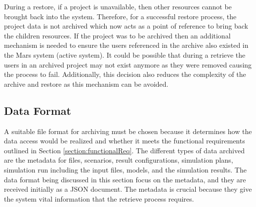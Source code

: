 During a restore, if a project
is unavailable, then other resources cannot be brought back into the system. Therefore, for a successful restore process,
the project data is not archived which now acts as a point of reference to bring back the children resources. 
If the project was to be archived then an additional mechanism is needed to ensure the users referenced in the archive also existed in the Mars system (active system).
It could be possible that during a retrieve the users in an
archived project may not exist anymore as they were removed causing the process to fail. Additionally, this decision also reduces the complexity of the 
archive and restore as this mechanism can be avoided.


\subsection{Data Format}
A suitable file format for archiving must be chosen because it determines how the data access would be realized and whether it meets
the functional requirements outlined in Section \ref{section:functionalReq}. The different types of data archived are the metadata for files, scenarios, 
result configurations, simulation plans, simulation run including the input files, models, and the simulation results. 
The data format being discussed in this section focus on the metadata, and they are received initially as a JSON document.
The metadata is crucial because they give the system vital information that the retrieve process requires. 

